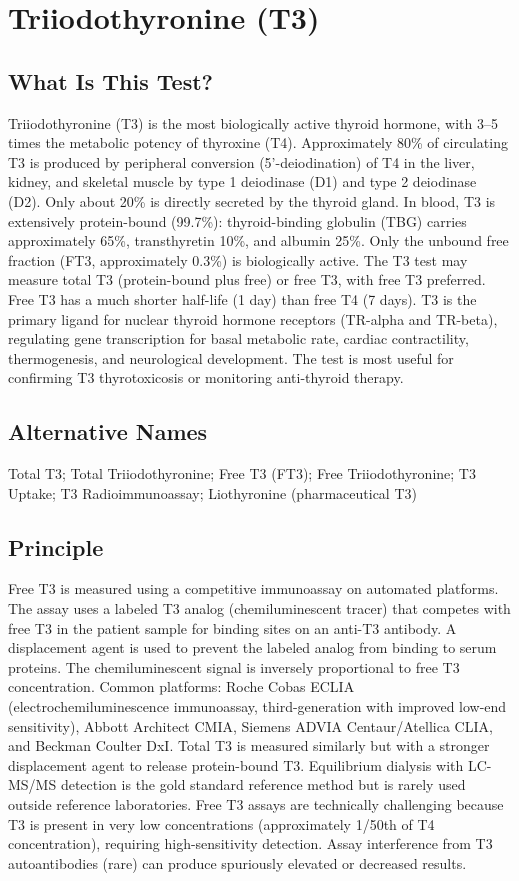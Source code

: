 \chapter{Triiodothyronine (T3)}

\section*{What Is This Test?}
Triiodothyronine (T3) is the most biologically active thyroid hormone, with 3--5 times the metabolic potency of thyroxine (T4). Approximately 80\% of circulating T3 is produced by peripheral conversion (5'-deiodination) of T4 in the liver, kidney, and skeletal muscle by type 1 deiodinase (D1) and type 2 deiodinase (D2). Only about 20\% is directly secreted by the thyroid gland. In blood, T3 is extensively protein-bound (99.7\%): thyroid-binding globulin (TBG) carries approximately 65\%, transthyretin 10\%, and albumin 25\%. Only the unbound free fraction (FT3, approximately 0.3\%) is biologically active. The T3 test may measure total T3 (protein-bound plus free) or free T3, with free T3 preferred. Free T3 has a much shorter half-life (1 day) than free T4 (7 days). T3 is the primary ligand for nuclear thyroid hormone receptors (TR-alpha and TR-beta), regulating gene transcription for basal metabolic rate, cardiac contractility, thermogenesis, and neurological development. The test is most useful for confirming T3 thyrotoxicosis or monitoring anti-thyroid therapy.

\section*{Alternative Names}
Total T3; Total Triiodothyronine; Free T3 (FT3); Free Triiodothyronine; T3 Uptake; T3 Radioimmunoassay; Liothyronine (pharmaceutical T3)

\section*{Principle}
Free T3 is measured using a competitive immunoassay on automated platforms. The assay uses a labeled T3 analog (chemiluminescent tracer) that competes with free T3 in the patient sample for binding sites on an anti-T3 antibody. A displacement agent is used to prevent the labeled analog from binding to serum proteins. The chemiluminescent signal is inversely proportional to free T3 concentration. Common platforms: Roche Cobas ECLIA (electrochemiluminescence immunoassay, third-generation with improved low-end sensitivity), Abbott Architect CMIA, Siemens ADVIA Centaur/Atellica CLIA, and Beckman Coulter DxI. Total T3 is measured similarly but with a stronger displacement agent to release protein-bound T3. Equilibrium dialysis with LC-MS/MS detection is the gold standard reference method but is rarely used outside reference laboratories. Free T3 assays are technically challenging because T3 is present in very low concentrations (approximately 1/50th of T4 concentration), requiring high-sensitivity detection. Assay interference from T3 autoantibodies (rare) can produce spuriously elevated or decreased results.

